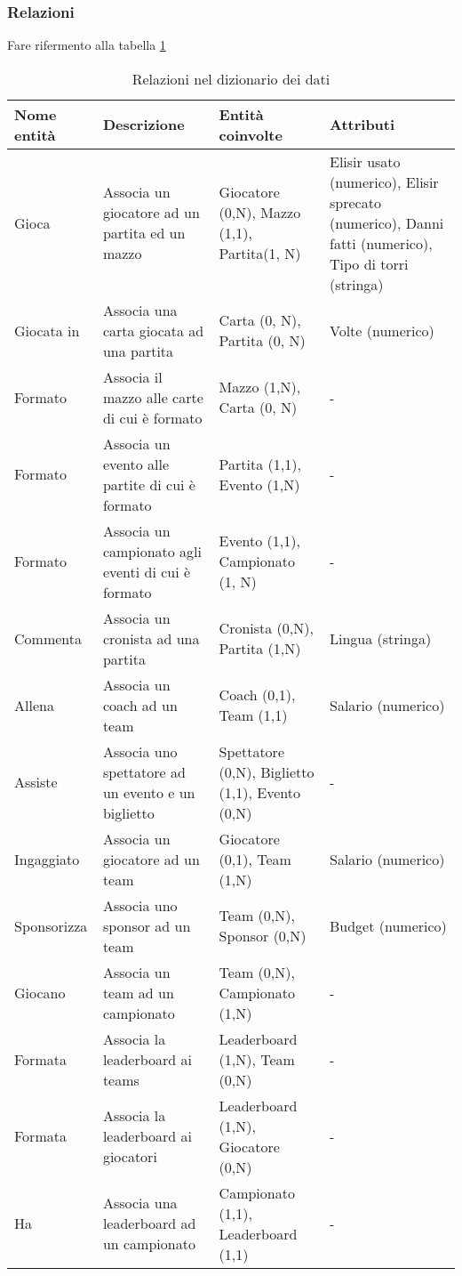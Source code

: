 \documentclass{article}
\begin{document}
\subsubsection{Relazioni}
Fare rifermento alla tabella \ref{table_relazioni_dizionario}

\begin{table}
\centering
\begin{tabularx}{\textwidth}{|l|X|X|X|}
\hline
\textbf{Nome entità}   & \textbf{Descrizione} & \textbf{Entità coinvolte} & \textbf{Attributi} \\ \hline
Gioca & Associa un giocatore ad un partita ed un mazzo & Giocatore (0,N), Mazzo (1,1), Partita(1, N) & Elisir usato (numerico), Elisir sprecato (numerico), Danni fatti (numerico), Tipo di torri (stringa) \\ \hline
Giocata in & Associa una carta giocata ad una partita & Carta (0, N), Partita (0, N) & Volte (numerico) \\ \hline
Formato & Associa il mazzo alle carte di cui è formato & Mazzo (1,N), Carta (0, N) & - \\ \hline
Formato & Associa un evento alle partite di cui è formato & Partita (1,1), Evento (1,N) & - \\ \hline
Formato & Associa un campionato agli eventi di cui è formato & Evento (1,1), Campionato (1, N) & - \\ \hline
Commenta & Associa un cronista ad una partita & Cronista (0,N), Partita (1,N) & Lingua (stringa) \\ \hline
Allena & Associa un coach ad un team & Coach (0,1), Team (1,1) & Salario (numerico) \\ \hline
Assiste & Associa uno spettatore ad un evento e un biglietto & Spettatore (0,N), Biglietto (1,1), Evento (0,N) & - \\ \hline
Ingaggiato & Associa un giocatore ad un team & Giocatore (0,1), Team (1,N) & Salario (numerico) \\ \hline
Sponsorizza & Associa uno sponsor ad un team & Team (0,N), Sponsor (0,N) & Budget (numerico) \\ \hline
Giocano & Associa un team ad un campionato & Team (0,N), Campionato (1,N) & - \\ \hline
Formata & Associa la leaderboard ai teams & Leaderboard (1,N), Team (0,N) & - \\ \hline
Formata & Associa la leaderboard ai giocatori& Leaderboard (1,N), Giocatore (0,N) & - \\ \hline
Ha & Associa una leaderboard ad un campionato & Campionato (1,1), Leaderboard (1,1) & - \\ \hline

\end{tabularx}
\caption{Relazioni nel dizionario dei dati}
\label{table_relazioni_dizionario}
\end{table}
\end{document}
